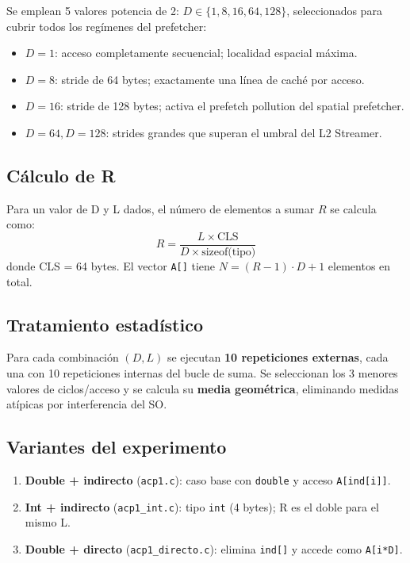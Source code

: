 \documentclass[12pt,a4paper]{article}
\begin{document}
Se emplean 5 valores potencia de 2: $D \in \{1, 8, 16, 64, 128\}$, seleccionados para cubrir todos los regímenes del prefetcher:

\begin{itemize}[leftmargin=1.5em]
  \item $D=1$: acceso completamente secuencial; localidad espacial máxima.
  \item $D=8$: stride de 64 bytes; exactamente una línea de caché por acceso.
  \item $D=16$: stride de 128 bytes; activa el prefetch pollution del spatial prefetcher.
  \item $D=64, D=128$: strides grandes que superan el umbral del L2 Streamer.
\end{itemize}

\subsection{Cálculo de R}

Para un valor de D y L dados, el número de elementos a sumar $R$ se calcula como:
\[
  R = \frac{L \times \text{CLS}}{D \times \text{sizeof(tipo)}}
\]
donde CLS = 64 bytes. El vector \texttt{A[]} tiene $N = (R-1) \cdot D + 1$ elementos en total.

\subsection{Tratamiento estadístico}

Para cada combinación $(D, L)$ se ejecutan \textbf{10 repeticiones externas}, cada una con 10 repeticiones internas del bucle de suma. Se seleccionan los 3 menores valores de ciclos/acceso y se calcula su \textbf{media geométrica}, eliminando medidas atípicas por interferencia del SO.

\subsection{Variantes del experimento}

\begin{enumerate}[leftmargin=1.5em]
  \item \textbf{Double + indirecto} (\texttt{acp1.c}): caso base con \texttt{double} y acceso \texttt{A[ind[i]]}.
  \item \textbf{Int + indirecto} (\texttt{acp1\_int.c}): tipo \texttt{int} (4 bytes); R es el doble para el mismo L.
  \item \textbf{Double + directo} (\texttt{acp1\_directo.c}): elimina \texttt{ind[]} y accede como \texttt{A[i*D]}.
\end{enumerate}
\end{document}
